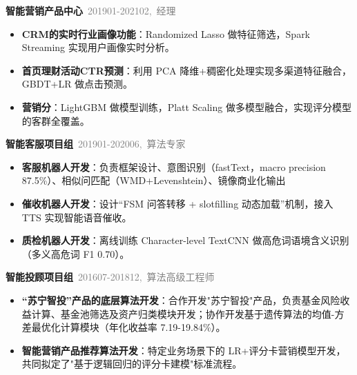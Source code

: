 \documentclass{resume}
\newenvironment{graybox}{%
  \begin{mdframed}[backgroundcolor=lightgray,linewidth=0pt,innerleftmargin=8pt,innerrightmargin=8pt,innertopmargin=6pt,innerbottommargin=6pt]
}{%
  \end{mdframed}
}
\begin{document}
\begin{graybox}

\vspace{0.5em}
\noindent{\color{gray!40}\rule{\textwidth}{0.2pt}}

\textbf{智能营销产品中心}\ {\small\textcolor{gray}{\hfill 201901-202102,\ 经理}}
\begin{onehalfspacing}
\begin{itemize}
  \item \textbf{CRM的实时行业画像功能}：Randomized Lasso 做特征筛选，Spark Streaming 实现用户画像实时分析。
  
  \item \textbf{首页理财活动CTR预测}：利用 PCA 降维+稠密化处理实现多渠道特征融合，GBDT+LR 做点击预测。
  
  \item \textbf{营销分}：LightGBM 做模型训练，Platt Scaling 做多模型融合，实现评分模型的客群全覆盖。
\end{itemize}
\end{onehalfspacing}

\vspace{0.3em}
\textbf{智能客服项目组}\ {\small\textcolor{gray}{\hfill 201901-202006,\ 算法专家}}
\begin{onehalfspacing}
\begin{itemize}
  \item \textbf{客服机器人开发}：负责框架设计、意图识别（fastText，macro precision 87.5\%）、相似问匹配（WMD+Levenshtein）、镜像商业化输出
  
  \item \textbf{催收机器人开发}：设计“FSM 问答转移 + slotfilling 动态加载”机制，接入 TTS 实现智能语音催收。
  
  \item \textbf{质检机器人开发}：离线训练 Character-level TextCNN 做高危词语境含义识别（多义高危词 F1 0.70）。
\end{itemize}
\end{onehalfspacing}

\vspace{0.3em}
\textbf{智能投顾项目组}\ {\small\textcolor{gray}{\hfill 201607-201812,\ 算法高级工程师}}
\begin{onehalfspacing}
\begin{itemize}
  \item \textbf{“苏宁智投”产品的底层算法开发}：合作开发"苏宁智投"产品，负责基金风险收益计算、基金池筛选及资产归类模块开发；协作开发基于遗传算法的均值-方差最优化计算模块（年化收益率 7.19-19.84\%）。
  
  \item \textbf{智能营销产品推荐算法开发}：特定业务场景下的 LR+评分卡营销模型开发，共同拟定了"基于逻辑回归的评分卡建模"标准流程。
\end{itemize}
\end{onehalfspacing}
\end{graybox}
\end{document}
